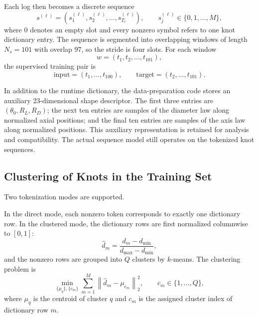 \documentclass[11pt]{article}
\begin{document}
Each log then becomes a discrete sequence
\begin{equation}
s^{(\ell)} = \left(s^{(\ell)}_1, s^{(\ell)}_2, \ldots, s^{(\ell)}_{T_\ell}\right),
\qquad
s^{(\ell)}_j \in \{0,1,\ldots,M\},
\end{equation}
where $0$ denotes an empty slot and every nonzero symbol refers to one knot dictionary entry. The sequence is
segmented into overlapping windows of length $N_s = 101$ with overlap $97$, so the stride is four slots. For
each window
\begin{equation}
w = \left(t_1, t_2, \ldots, t_{101}\right),
\end{equation}
the supervised training pair is
\begin{equation}
\text{input} = \left(t_1,\ldots,t_{100}\right), \qquad
\text{target} = \left(t_2,\ldots,t_{101}\right).
\end{equation}

In addition to the runtime dictionary, the data-preparation code stores an auxiliary 23-dimensional shape
descriptor. The first three entries are $(\theta_0,R_L,R_D)$; the next ten entries are samples of the diameter
law along normalized axial positions; and the final ten entries are samples of the axis law along normalized
positions. This auxiliary representation is retained for analysis and compatibility. The actual sequence model
still operates on the tokenized knot sequences.

\subsection{Clustering of Knots in the Training Set}

Two tokenization modes are supported.

In the direct mode, each nonzero token corresponds to exactly one dictionary row. In the clustered mode, the
dictionary rows are first normalized columnwise to $[0,1]$:
\begin{equation}
\widehat{d}_m = \frac{d_m - d_{\min}}{d_{\max} - d_{\min}},
\end{equation}
and the nonzero rows are grouped into $Q$ clusters by $k$-means. The clustering problem is
\begin{equation}
\min_{\{\mu_q\}, \{c_m\}}
\sum_{m=1}^{M}
\left\lVert \widehat{d}_m - \mu_{c_m} \right\rVert_2^2,
\qquad
c_m \in \{1,\ldots,Q\},
\end{equation}
where $\mu_q$ is the centroid of cluster $q$ and $c_m$ is the assigned cluster index of dictionary row $m$.
\end{document}
